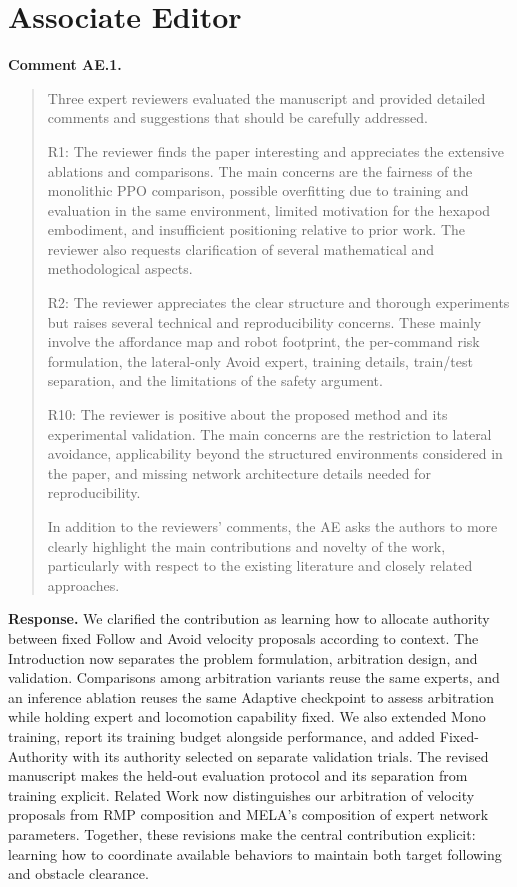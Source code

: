 \documentclass[letterpaper,11pt]{article}
\begin{document}
\section*{Associate Editor}
\noindent\textbf{Comment AE.1.}
\begin{quote}\color{reviewgray}
Three expert reviewers evaluated the manuscript and provided detailed comments and suggestions that should be carefully addressed.

R1: The reviewer finds the paper interesting and appreciates the extensive ablations and comparisons. The main concerns are the fairness of the monolithic PPO comparison, possible overfitting due to training and evaluation in the same environment, limited motivation for the hexapod embodiment, and insufficient positioning relative to prior work. The reviewer also requests clarification of several mathematical and methodological aspects.

R2: The reviewer appreciates the clear structure and thorough experiments but raises several technical and reproducibility concerns. These mainly involve the affordance map and robot footprint, the per-command risk formulation, the lateral-only Avoid expert, training details, train/test separation, and the limitations of the safety argument.

R10: The reviewer is positive about the proposed method and its experimental validation. The main concerns are the restriction to lateral avoidance, applicability beyond the structured environments considered in the paper, and missing network architecture details needed for reproducibility.

In addition to the reviewers’ comments, the AE asks the authors to more clearly highlight the main contributions and novelty of the work, particularly with respect to the existing literature and closely related approaches.
\end{quote}
\noindent\textbf{Response.}
We clarified the contribution as learning how to allocate authority between fixed Follow and Avoid velocity proposals according to context. The Introduction now separates the problem formulation, arbitration design, and validation. Comparisons among arbitration variants reuse the same experts, and an inference ablation reuses the same Adaptive checkpoint to assess arbitration while holding expert and locomotion capability fixed. We also extended Mono training, report its training budget alongside performance, and added Fixed-Authority with its authority selected on separate validation trials. The revised manuscript makes the held-out evaluation protocol and its separation from training explicit. Related Work now distinguishes our arbitration of velocity proposals from RMP composition and MELA's composition of expert network parameters. Together, these revisions make the central contribution explicit: learning how to coordinate available behaviors to maintain both target following and obstacle clearance.
\par\nopagebreak[4]
\end{document}

